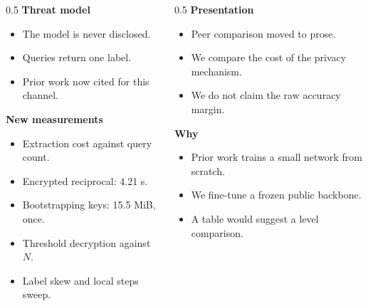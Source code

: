 \documentclass[aspectratio=169,11pt]{beamer}
\begin{document}
\begin{frame}
  \begin{columns}[T]
    \begin{column}{0.5\textwidth}
      \textbf{Threat model}
      \begin{itemize}\small
        \item The model is never disclosed.
        \item Queries return one label.
        \item Prior work now cited for this channel.
      \end{itemize}
      \vspace{0.6em}
      \textbf{New measurements}
      \begin{itemize}\small
        \item Extraction cost against query count.
        \item Encrypted reciprocal: 4.21 s.
        \item Bootstrapping keys: 15.5 MiB, once.
        \item Threshold decryption against $N$.
        \item Label skew and local steps sweep.
      \end{itemize}
    \end{column}
    \begin{column}{0.5\textwidth}
      \textbf{Presentation}
      \begin{itemize}\small
        \item Peer comparison moved to prose.
        \item We compare the cost of the privacy mechanism.
        \item We do not claim the raw accuracy margin.
      \end{itemize}
      \vspace{0.6em}
      \textbf{Why}
      \begin{itemize}\small
        \item Prior work trains a small network from scratch.
        \item We fine-tune a frozen public backbone.
        \item A table would suggest a level comparison.
      \end{itemize}
    \end{column}
  \end{columns}
\end{frame}
\end{document}
